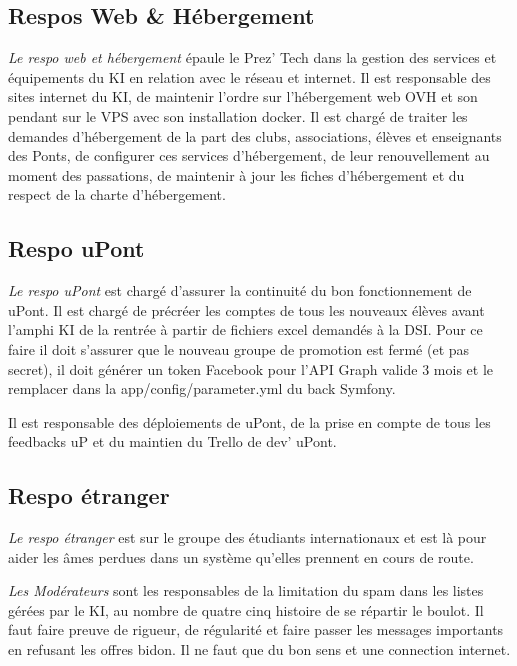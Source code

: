 \documentclass{ki019}
\begin{document}
\subsection{Respos Web \& Hébergement}

\emph{Le respo web et hébergement} épaule le Prez’ Tech dans la gestion des services et équipements du KI en relation avec le réseau et internet. Il est responsable des sites internet du KI, de maintenir l’ordre sur l’hébergement web OVH et son pendant sur le VPS avec son installation docker. Il est chargé de traiter les demandes d’hébergement de la part des clubs, associations, élèves et enseignants des Ponts, de configurer ces services d’hébergement, de leur renouvellement au moment des passations, de maintenir à jour les fiches d’hébergement et du
respect de la charte d’hébergement.

\subsection{Respo uPont}

\emph{Le respo uPont} est chargé d’assurer la continuité du bon fonctionnement de uPont. Il est chargé de précréer les comptes de tous les nouveaux élèves avant l’amphi KI de la rentrée à partir de fichiers excel demandés à la DSI. Pour ce faire il doit s’assurer que le nouveau groupe de promotion est fermé (et pas secret), il doit générer un token Facebook pour l’API Graph valide 3 mois et le remplacer dans la app/config/parameter.yml du back Symfony.

Il est responsable des déploiements de uPont, de la prise en compte de tous les feedbacks uP et du maintien du Trello de dev’ uPont.

\subsection{Respo étranger​}

\emph{Le respo étranger} est sur le groupe des étudiants internationaux et est là pour aider les âmes perdues dans un système qu’elles prennent en cours de route.


\emph{Les Modérateurs} sont les responsables de la limitation du spam dans les listes gérées par le KI, au nombre de quatre cinq histoire de se répartir le boulot. Il faut faire preuve de rigueur, de régularité et faire passer les messages importants en refusant les offres bidon. Il ne faut que du bon sens et une connection internet.

\Footer{\today}
\end{document}
